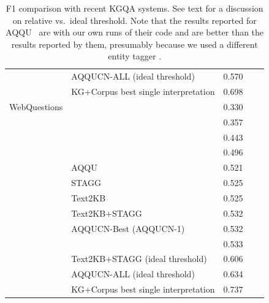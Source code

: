 \documentclass{svjour3}
\begin{document}
\begin{table}[th]
\begin{tabular}{| c | l | c |c|c|}
& AQQUCN-ALL (ideal threshold) & \cellcolor{blue!10} 0.570 \\ %
& KG+Corpus best single interpretation & \cellcolor{blue!10} 0.698 \\
\hline
\hline
WebQuestions
& \citet{YaoVD2014Jacana} & 0.330\\ %
& \citet{BerantCFL2013SEMPRE} & 0.357 \\%
& \citet{Yao2015LeanQA} & 0.443\\ %
& \citet{BerantL2015AgendaIL} & 0.496 \\%
& AQQU \citep{BastH2015aqqu} & 0.521 \\ %
& STAGG \citep{YihCHG2015STAGG} & 0.525 \\%
& Text2KB \citep{SavenkovA2016KbCorpusQa} & 0.525\\%
& Text2KB+STAGG & 0.532 \\%
& AQQUCN-Best (AQQUCN-1) & \cellcolor{yellow!20} 0.532 \\
& \citet{XuRFHZ2016FbCorpusQA} & \cellcolor{green!10} 0.533 \\%
& Text2KB+STAGG (ideal threshold) & \cellcolor{blue!7} 0.606\\%
& AQQUCN-ALL (ideal threshold) & \cellcolor{blue!10} 0.634 \\%
& KG+Corpus best single interpretation & \cellcolor{blue!10} 0.737 \\
\hline
\end {tabular}
\caption{F1 comparison with recent KGQA systems.  See text
  for a discussion on relative vs.\ ideal threshold. Note that the results reported for AQQU~\citep{BastH2015aqqu} are with our own runs of their code and are better than the results reported by them, presumably because we used a different entity tagger \citep{FerraginaS2010TagMe}.}
\label{fig:finalcomparisonF1}
\end{table}
\end{document}
